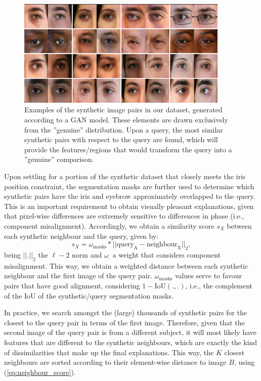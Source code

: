 \begin{figure}[H]
\centering
\includegraphics[width=0.9\textwidth]{figures/figure_28.pdf}
\caption{Examples of the synthetic image pairs in our dataset, generated according to a \ac{GAN} model. These elements are drawn exclusively from the ''genuine'' distribution. Upon  a query, the most similar synthetic pairs with respect to the query are found, which will provide the features/regions that would transform the query into a ''genuine'' comparison.}
\label{fig:synthetic_samples}
\end{figure}

Upon settling for a portion of the synthetic dataset that closely meets the iris position constraint, the segmentation masks are further used to determine which synthetic pairs have the iris and eyebrow approximately overlapped to the query. This is an important requirement to obtain visually pleasant explanations, given that pixel-wise differences are extremely sensitive to differences in phase (i.e., component misalignment). Accordingly, we obtain a similarity score $s_X$ between each synthetic neighbour and the query, given by:
\begin{equation}
    s_X = \omega_{\text{masks}} * ||\text{query}_{\text{A}} - \text{neighbour}_{\text{X}}||_2,
\label{eq:neighbour_score}
\end{equation}
being $||.||_2$ the $\ell-2$ norm and $\omega_.$ a weight that considers component misalignment. This way, we obtain a weighted distance between each synthetic neighbour and the first image of the query pair. $\omega_{\text{masks}}$ values serve to favour pairs that have good alignment, considering $1 - \text{IoU}(.,.)$, i.e., the complement of the \ac{IoU} of the synthetic/query segmentation masks. 

In practice, we search amongst the (large) thousands of synthetic pairs for the closest to the query pair in terms of the first image. Therefore, given that the second image of the query pair is from a different subject, it will most likely have features that are different to the synthetic neighbours, which are exactly the kind of dissimilarities that make up the final explanations.
This way, the $K$ closest neighbours are sorted according to their element-wise distance to image $B$, using  (\ref{eq:neighbour_score}). 

